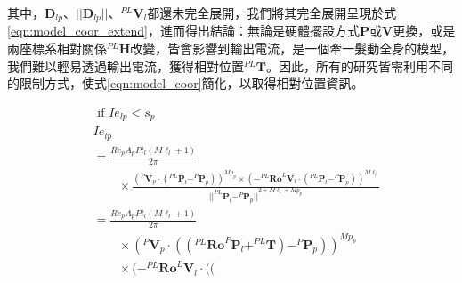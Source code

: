\begin{description}
        \qquad
        其中，${\boldsymbol{D}_{lp}}$、$||{\boldsymbol{D}_{lp}}||$、$^{PL}\boldsymbol{V}_l$都還未完全展開，我們將其完全展開呈現於式\ref{eqn:model_coor_extend}，進而得出結論：無論是硬體擺設方式$\boldsymbol{P}$或$\boldsymbol{V}$更換，或是兩座標系相對關係$^{PL}\boldsymbol{H}$改變，皆會影響到輸出電流，是一個牽一髮動全身的模型，我們難以輕易透過輸出電流，獲得相對位置$^{PL}\boldsymbol{T}$。因此，所有的研究皆需利用不同的限制方式，使式\ref{eqn:model_coor}簡化，以取得相對位置資訊。


        \begin{equation}
            \label{eqn:model_coor_extend}
            \begin{aligned}
                &\text { if } Ie_{lp}<s_p \\
                &Ie_{lp} \\&= \frac{Re_pA_pPt_l(M\ell_{l}+1)}{2 \pi} 
                \\
                &\qquad \times
                 \frac{ 
                    {(
                        ^{P}\boldsymbol{V}_p 
                        \cdot 
                        (
                            ^{PL}\boldsymbol{P}_l- ^{P}\boldsymbol{P}_p
                        )
                    )}
                    ^{Mp_{p}}
                    \times 
                    {(
                        -^{PL}\boldsymbol{Ro}^{L}\boldsymbol{V}_l 
                        \cdot 
                        ({
                            ^{PL}\boldsymbol{P}_l
                            - ^{P}\boldsymbol{P}_p
                        })
                    )}^{M\ell_{l}}
                } 
                  {{||^{PL}\boldsymbol{P}_l- ^{P}\boldsymbol{P}_p||}^{2+M\ell_l+Mp_p}}\\
                  &= \frac{Re_pA_pPt_l(M\ell_{l}+1)}{2 \pi}\\
                  &\qquad\times 
                  {( ^{P}\boldsymbol{V}_p \cdot 
                            (
                                (
                                    ^{PL} \boldsymbol{Ro}^{P}\boldsymbol{P}_l
                                    + ^{PL}\boldsymbol{T}
                                )
                                - ^{P}\boldsymbol{P}_p
                            )
                        )}^{Mp_{p}}\\
                &\qquad\times
                {
                            (
                                -^{PL}\boldsymbol{Ro}^{L}\boldsymbol{V}_l 
                                \cdot 
                                (
                                    (
}
\end{aligned}
\end{equation}
\end{description}
